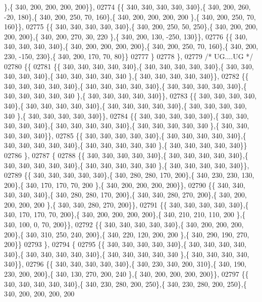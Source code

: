 \begin{DoxyCode}
      \},\{ 340, 200, 200, 200, 200\}\},
02774 \{\{ 340, 340, 340, 340, 340\},\{ 340, 200, 260, -20, 180\},\{ 340, 200, 250,  70, 160\},\{ 340, 200, 200, 200, 200
      \},\{ 340, 200, 250,  70, 160\}\},
02775 \{\{ 340, 340, 340, 340, 340\},\{ 340, 200, 250,  50, 250\},\{ 340, 200, 200, 200, 200\},\{ 340, 200, 270,  30, 220
      \},\{ 340, 200, 130, -250, 130\}\},
02776 \{\{ 340, 340, 340, 340, 340\},\{ 340, 200, 200, 200, 200\},\{ 340, 200, 250,  70, 160\},\{ 340, 200, 230, -150, 
      230\},\{ 340, 200, 170,  70,  80\}\}
02777 \}
02778 \},
02779 \textcolor{comment}{/* UG....UG */}
02780 \{\{
02781 \{\{ 340, 340, 340, 340, 340\},\{ 340, 340, 340, 340, 340\},\{ 340, 340, 340, 340, 340\},\{ 340, 340, 340, 340, 340
      \},\{ 340, 340, 340, 340, 340\}\},
02782 \{\{ 340, 340, 340, 340, 340\},\{ 340, 340, 340, 340, 340\},\{ 340, 340, 340, 340, 340\},\{ 340, 340, 340, 340, 340
      \},\{ 340, 340, 340, 340, 340\}\},
02783 \{\{ 340, 340, 340, 340, 340\},\{ 340, 340, 340, 340, 340\},\{ 340, 340, 340, 340, 340\},\{ 340, 340, 340, 340, 340
      \},\{ 340, 340, 340, 340, 340\}\},
02784 \{\{ 340, 340, 340, 340, 340\},\{ 340, 340, 340, 340, 340\},\{ 340, 340, 340, 340, 340\},\{ 340, 340, 340, 340, 340
      \},\{ 340, 340, 340, 340, 340\}\},
02785 \{\{ 340, 340, 340, 340, 340\},\{ 340, 340, 340, 340, 340\},\{ 340, 340, 340, 340, 340\},\{ 340, 340, 340, 340, 340
      \},\{ 340, 340, 340, 340, 340\}\}
02786 \},
02787 \{
02788 \{\{ 340, 340, 340, 340, 340\},\{ 340, 340, 340, 340, 340\},\{ 340, 340, 340, 340, 340\},\{ 340, 340, 340, 340, 340
      \},\{ 340, 340, 340, 340, 340\}\},
02789 \{\{ 340, 340, 340, 340, 340\},\{ 340, 280, 280, 170, 200\},\{ 340, 230, 230, 130, 200\},\{ 340, 170, 170,  70, 200
      \},\{ 340, 200, 200, 200, 200\}\},
02790 \{\{ 340, 340, 340, 340, 340\},\{ 340, 280, 280, 170, 200\},\{ 340, 340, 280, 270, 200\},\{ 340, 200, 200, 200, 200
      \},\{ 340, 340, 280, 270, 200\}\},
02791 \{\{ 340, 340, 340, 340, 340\},\{ 340, 170, 170,  70, 200\},\{ 340, 200, 200, 200, 200\},\{ 340, 210, 210, 110, 200
      \},\{ 340, 100,   0,  70, 200\}\},
02792 \{\{ 340, 340, 340, 340, 340\},\{ 340, 200, 200, 200, 200\},\{ 340, 310, 250, 240, 200\},\{ 340, 220, 120, 200, 200
      \},\{ 340, 290, 190, 270, 200\}\}
02793 \},
02794 \{
02795 \{\{ 340, 340, 340, 340, 340\},\{ 340, 340, 340, 340, 340\},\{ 340, 340, 340, 340, 340\},\{ 340, 340, 340, 340, 340
      \},\{ 340, 340, 340, 340, 340\}\},
02796 \{\{ 340, 340, 340, 340, 340\},\{ 340, 230, 340, 200, 310\},\{ 340, 190, 230, 200, 200\},\{ 340, 130, 270, 200, 240
      \},\{ 340, 200, 200, 200, 200\}\},
02797 \{\{ 340, 340, 340, 340, 340\},\{ 340, 230, 280, 200, 250\},\{ 340, 230, 280, 200, 250\},\{ 340, 200, 200, 200, 200

\end{DoxyCode}
